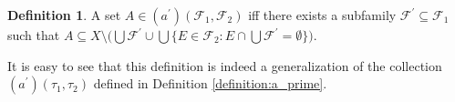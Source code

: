 \documentclass[12pt]{amsart}
\theoremstyle{plain}
\theoremstyle{definition}
\newtheorem{definition}[theorem]{Definition}
\theoremstyle{remark}
\newcommand{\cF}{{\mathcal F}}
\newcommand{\aidealprime}{\mathit{(a^\prime)}}
\begin{document}
\begin{definition}
A set $A \in \aidealprime(\cF_1, \cF_2)$ iff there exists
a subfamily $\cF^\prime \subseteq \cF_1$ such 
that $A \subseteq X \setminus \big( \bigcup \cF^\prime \cup 
\bigcup \lbrace E \in \cF_2 \colon E \cap \bigcup \cF^\prime = \emptyset \rbrace\big)$.
\end{definition}

  It is easy to see that this definition is indeed a generalization
of the collection $\aidealprime(\tau_1, \tau_2)$ defined in 
Definition \ref{definition:a_prime}.


\end{document}
